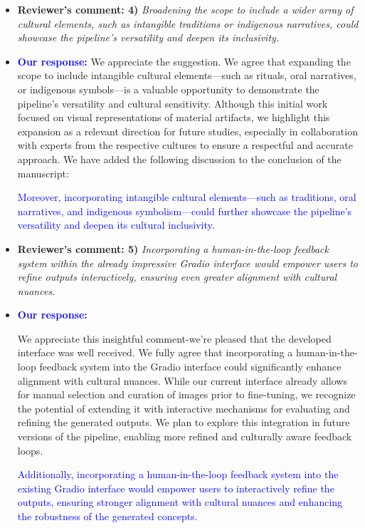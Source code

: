 \documentclass[11pt]{article}
\begin{document}
\begin{itemize}
\item {\bf Reviewer's comment: 4)} {\it
Broadening the scope to include a wider array of cultural elements, such as intangible traditions or indigenous narratives, could showcase the pipeline's versatility and deepen its inclusivity.}

\item {\bf \textcolor{blue}{Our response:}} We appreciate the suggestion. We agree that expanding the scope to include intangible cultural elements—such as rituals, oral narratives, or indigenous symbols—is a valuable opportunity to demonstrate the pipeline’s versatility and cultural sensitivity. Although this initial work focused on visual representations of material artifacts, we highlight this expansion as a relevant direction for future studies, especially in collaboration with experts from the respective cultures to ensure a respectful and accurate approach. We have added the following discussion to the conclusion of the manuscript:

\textcolor{blue}{Moreover, incorporating intangible cultural elements—such as traditions, oral narratives, and indigenous symbolism—could further showcase the pipeline’s versatility and deepen its cultural inclusivity}. 


\item {\bf Reviewer's comment: 5)} {\it
Incorporating a human-in-the-loop feedback system within the already impressive Gradio interface would empower users to refine outputs interactively, ensuring even greater alignment with cultural nuances.
}
\item {\bf \textcolor{blue}{Our response:}} 

We appreciate this insightful comment-we’re pleased that the developed interface was well received. We fully agree that incorporating a human-in-the-loop feedback system into the Gradio interface could significantly enhance alignment with cultural nuances. While our current interface already allows for manual selection and curation of images prior to fine-tuning, we recognize the potential of extending it with interactive mechanisms for evaluating and refining the generated outputs. We plan to explore this integration in future versions of the pipeline, enabling more refined and culturally aware feedback loops.

\textcolor{blue}{Additionally, incorporating a human-in-the-loop feedback system into the existing Gradio interface would empower users to interactively refine the outputs, ensuring stronger alignment with cultural nuances and enhancing the robustness of the generated concepts}.


\end{itemize}
\end{document}

